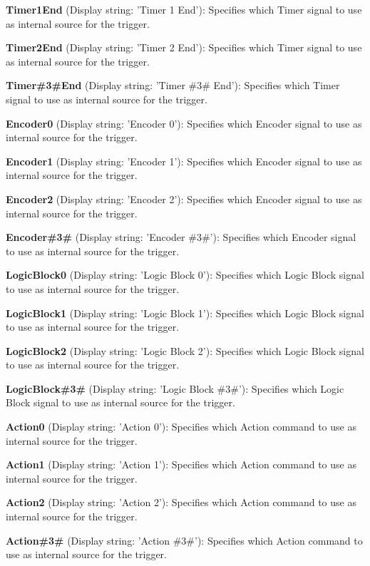 \begin{DoxyItemize}
\item {\bfseries Timer1\+End} (Display string\+: 'Timer 1 End')\+: Specifies which Timer signal to use as internal source for the trigger.
\item {\bfseries Timer2\+End} (Display string\+: 'Timer 2 End')\+: Specifies which Timer signal to use as internal source for the trigger.
\item {\bfseries Timer\#3\#End} (Display string\+: 'Timer \#3\# End')\+: Specifies which Timer signal to use as internal source for the trigger.
\item {\bfseries Encoder0} (Display string\+: 'Encoder 0')\+: Specifies which Encoder signal to use as internal source for the trigger.
\item {\bfseries Encoder1} (Display string\+: 'Encoder 1')\+: Specifies which Encoder signal to use as internal source for the trigger.
\item {\bfseries Encoder2} (Display string\+: 'Encoder 2')\+: Specifies which Encoder signal to use as internal source for the trigger.
\item {\bfseries Encoder\#3\#} (Display string\+: 'Encoder \#3\#')\+: Specifies which Encoder signal to use as internal source for the trigger.
\item {\bfseries Logic\+Block0} (Display string\+: 'Logic Block 0')\+: Specifies which Logic Block signal to use as internal source for the trigger.
\item {\bfseries Logic\+Block1} (Display string\+: 'Logic Block 1')\+: Specifies which Logic Block signal to use as internal source for the trigger.
\item {\bfseries Logic\+Block2} (Display string\+: 'Logic Block 2')\+: Specifies which Logic Block signal to use as internal source for the trigger.
\item {\bfseries Logic\+Block\#3\#} (Display string\+: 'Logic Block \#3\#')\+: Specifies which Logic Block signal to use as internal source for the trigger.
\item {\bfseries Action0} (Display string\+: 'Action 0')\+: Specifies which Action command to use as internal source for the trigger.
\item {\bfseries Action1} (Display string\+: 'Action 1')\+: Specifies which Action command to use as internal source for the trigger.
\item {\bfseries Action2} (Display string\+: 'Action 2')\+: Specifies which Action command to use as internal source for the trigger.
\item {\bfseries Action\#3\#} (Display string\+: 'Action \#3\#')\+: Specifies which Action command to use as internal source for the trigger.

\end{DoxyItemize}

